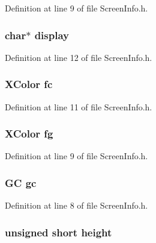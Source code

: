 Definition at line 9 of file ScreenInfo.h.

\hypertarget{struct_screen_info_ac49dfab9200d48f835ce64819c4fc878}{
\subsubsection[{display}]{\setlength{\rightskip}{0pt plus 5cm}char$\ast$ {\bf display}}}
\label{struct_screen_info_ac49dfab9200d48f835ce64819c4fc878}


Definition at line 12 of file ScreenInfo.h.

\hypertarget{struct_screen_info_a1c33682701113f93a154f659078b1940}{
\subsubsection[{fc}]{\setlength{\rightskip}{0pt plus 5cm}XColor {\bf fc}}}
\label{struct_screen_info_a1c33682701113f93a154f659078b1940}


Definition at line 11 of file ScreenInfo.h.

\hypertarget{struct_screen_info_aed0a28efb15ae5e30e0891b8af03b81f}{
\subsubsection[{fg}]{\setlength{\rightskip}{0pt plus 5cm}XColor {\bf fg}}}
\label{struct_screen_info_aed0a28efb15ae5e30e0891b8af03b81f}


Definition at line 9 of file ScreenInfo.h.

\hypertarget{struct_screen_info_a5da9d24666f1955a9b5ce3d2583b823a}{
\subsubsection[{gc}]{\setlength{\rightskip}{0pt plus 5cm}GC {\bf gc}}}
\label{struct_screen_info_a5da9d24666f1955a9b5ce3d2583b823a}


Definition at line 8 of file ScreenInfo.h.

\hypertarget{struct_screen_info_aa8e4172ede7827e837ac528eae04c497}{
\subsubsection[{height}]{\setlength{\rightskip}{0pt plus 5cm}unsigned short {\bf height}}}
\label{struct_screen_info_aa8e4172ede7827e837ac528eae04c497}


